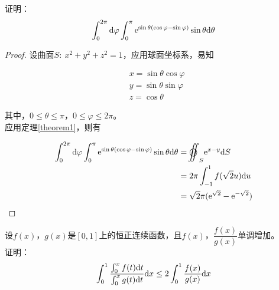 \begin{proposition}

    证明：$$\int_{0}^{2\pi}\mathrm{d} \varphi \int_{0}^{\pi}{\mathrm{e}^{\sin{\theta}(\cos{\varphi} - \sin{\varphi})}\sin{\theta}}\mathrm{d} \theta$$

\end{proposition}

\begin{proof}

    设曲面$S:\ x^2 + y^2 + z^2 = 1$，应用球面坐标系，易知

    \begin{align*}
        &x = \sin{\theta} \cos{\varphi} \\
        &y = \sin{\theta} \sin{\varphi} \\
        &z = \cos{\theta}         
    \end{align*}

    其中，$0 \leq \theta \leq \pi$，$0 \leq \varphi \leq 2\pi$。\\
    应用定理\ref{theorem1}，则有

    \begin{align*}
        \int_{0}^{2\pi}\diff \varphi \int_{0}^{\pi}{\euler^{\sin{\theta}(\cos{\varphi} - \sin{\varphi})}\sin{\theta}}\diff \theta & =\ooint_{S}{\euler^{x - y}}\diff S \\
        & = 2\pi \int_{-1}^{1}{f(\sqrt{2}u)}\diff u \\
        & = \sqrt{2}\pi(\euler^{\sqrt{2}} - \euler^{-\sqrt{2}})
    \end{align*}

\end{proof}

\begin{proposition}

    设$f(x)$，$g(x)$是$[0,1]$上的恒正连续函数，且$f(x)$，$\dfrac{f(x)}{g(x)}$单调增加。\\
    证明：
    $$\int_{0}^{1}{\dfrac{\int_{0}^{x}{f(t)}\mathrm{d} t}{\int_{0}^{x}{g(t)}\mathrm{d} t}}\mathrm{d} x \leq 2\int_{0}^{1}{\dfrac{f(x)}{g(x)}}\mathrm{d} x$$

\end{proposition}

